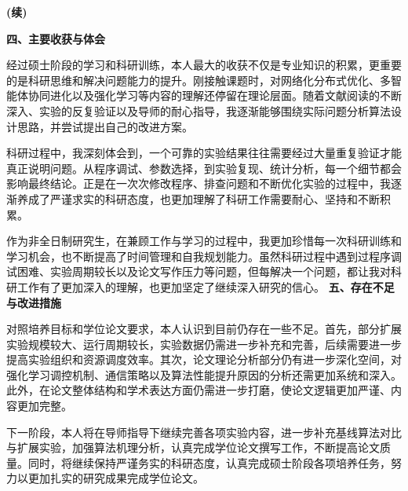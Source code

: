 \begin{titlepage}
    \makeatletter
    \makeatother
    \vspace{2.15cm}

\par
\textbf{(续)}
\par

\textbf{四、主要收获与体会}

\par
\indent
经过硕士阶段的学习和科研训练，本人最大的收获不仅是专业知识的积累，更重要的是科研思维和解决问题能力的提升。刚接触课题时，对网络化分布式优化、多智能体协同进化以及强化学习等内容的理解还停留在理论层面。随着文献阅读的不断深入、实验的反复验证以及导师的耐心指导，我逐渐能够围绕实际问题分析算法设计思路，并尝试提出自己的改进方案。

\par
\indent
科研过程中，我深刻体会到，一个可靠的实验结果往往需要经过大量重复验证才能真正说明问题。从程序调试、参数选择，到实验复现、统计分析，每一个细节都会影响最终结论。正是在一次次修改程序、排查问题和不断优化实验的过程中，我逐渐养成了严谨求实的科研态度，也更加理解了科研工作需要耐心、坚持和不断积累。

\par
\indent
作为非全日制研究生，在兼顾工作与学习的过程中，我更加珍惜每一次科研训练和学习机会，也不断提高了时间管理和自我规划能力。虽然科研过程中遇到过程序调试困难、实验周期较长以及论文写作压力等问题，但每解决一个问题，都让我对科研工作有了更加深入的理解，也更加坚定了继续深入研究的信心。
\noindent\textbf{五、存在不足与改进措施}

\par
\indent
对照培养目标和学位论文要求，本人认识到目前仍存在一些不足。首先，部分扩展实验规模较大、运行周期较长，实验数据仍需进一步补充和完善，后续需要进一步提高实验组织和资源调度效率。其次，论文理论分析部分仍有进一步深化空间，对强化学习调控机制、通信策略以及算法性能提升原因的分析还需更加系统和深入。此外，在论文整体结构和学术表达方面仍需进一步打磨，使论文逻辑更加严谨、内容更加完整。

\par
\indent
下一阶段，本人将在导师指导下继续完善各项实验内容，进一步补充基线算法对比与扩展实验，加强算法机理分析，认真完成学位论文撰写工作，不断提高论文质量。同时，将继续保持严谨务实的科研态度，认真完成硕士阶段各项培养任务，努力以更加扎实的研究成果完成学位论文。

\end{titlepage}
